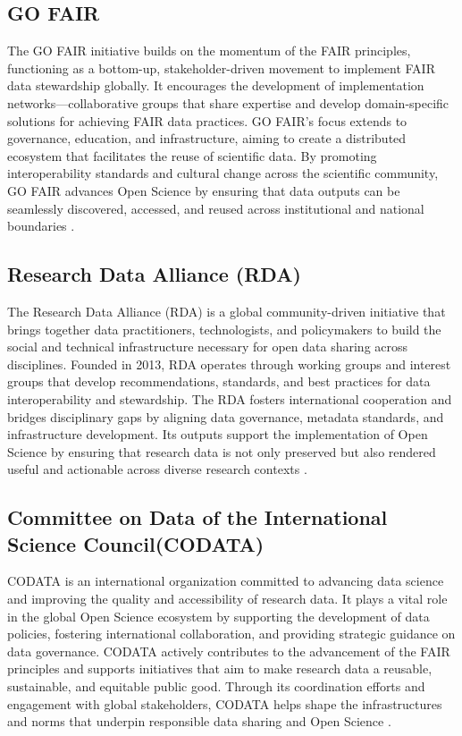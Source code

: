 \documentclass{article}
\begin{document}
\subsection{GO FAIR}
The GO FAIR initiative builds on the momentum of the FAIR principles, functioning as a bottom-up, stakeholder-driven movement to implement FAIR data stewardship globally. It encourages the development of implementation networks—collaborative groups that share expertise and develop domain-specific solutions for achieving FAIR data practices. GO FAIR’s focus extends to governance, education, and infrastructure, aiming to create a distributed ecosystem that facilitates the reuse of scientific data. By promoting interoperability standards and cultural change across the scientific community, GO FAIR advances Open Science by ensuring that data outputs can be seamlessly discovered, accessed, and reused across institutional and national boundaries \cite{mentzel_ready_2018}.


\subsection{Research Data Alliance (RDA)}
The Research Data Alliance (RDA) is a global community-driven initiative that brings together data practitioners, technologists, and policymakers to build the social and technical infrastructure necessary for open data sharing across disciplines. Founded in 2013, RDA operates through working groups and interest groups that develop recommendations, standards, and best practices for data interoperability and stewardship. The RDA fosters international cooperation and bridges disciplinary gaps by aligning data governance, metadata standards, and infrastructure development. Its outputs support the implementation of Open Science by ensuring that research data is not only preserved but also rendered useful and actionable across diverse research contexts \cite{berman_research_2020}.

\subsection{Committee on Data of the International Science Council(CODATA)}
CODATA is an international organization committed to advancing data science and improving the quality and accessibility of research data. It plays a vital role in the global Open Science ecosystem by supporting the development of data policies, fostering international collaboration, and providing strategic guidance on data governance. CODATA actively contributes to the advancement of the FAIR principles and supports initiatives that aim to make research data a reusable, sustainable, and equitable public good. Through its coordination efforts and engagement with global stakeholders, CODATA helps shape the infrastructures and norms that underpin responsible data sharing and Open Science \cite{codata_2024}.
\end{document}
